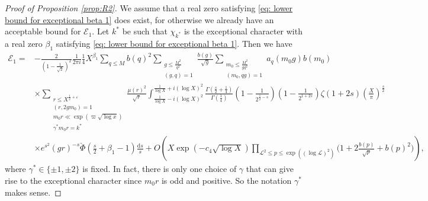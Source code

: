 \documentclass[12pt,reqno]{amsart}
\numberwithin{equation}{section}
\theoremstyle{plain}
\theoremstyle{definition}
\theoremstyle{remark}
\newcommand{\dd}{\mathrm{d}}
\begin{document}
\begin{proof}[Proof of Proposition \ref{prop:R2}]
We assume that a real zero satisfying \eqref{eq:  lower bound for exceptional beta 1} does exist, for otherwise we already have an acceptable bound for $\mathcal{E}_1$. Let $k^*$ be such that $\chi_{k^*}$ is the exceptional character with a real zero $\beta_1$ satisfying \eqref{eq:  lower bound for exceptional beta 1}. Then we have
\begin{equation}\label{eq: handle siegel zeros 1}
  \begin{split}
  \mathcal{E}_1=&-\frac{2}{\left( 1-\frac{1}{\sqrt{2}}\right)^2}\frac{1}{2\pi i}\frac{1}{4} X^{\beta_1} \sum_{q\leq M} b(q)^2 \sum_{\substack{ g\leq \frac{M^2}{q^2}\\ (g,q)=1}} \frac{b(g) }{ \sqrt{g}} \sum_{\substack{ m_0 \leq \frac{M^2}{gq^2} \\ (m_0,qg)=1}} a_q(m_0g)b(m_0)  \\
  &\times \sum_{\substack{r \leq X^{\frac{1}{2}+\varepsilon } \\ (r,2gm_0)=1 \\ m_0r\ll \exp(\varpi \sqrt{\log x}) \\ \gamma^*m_0r=k^*}} \frac{\mu (r)^2}{\sqrt{r}} \int_{\frac{1}{\log X}-i(\log X)^2}^{\frac{1}{\log X}+i(\log X)^2} \frac{\Gamma(\frac{s}{2}+\frac{1}{4})}{\Gamma(\frac{1}{4})} \left( 1-\frac{1}{2^{\frac{1}{2}-s}}\right)\left(1 - \frac{1}{2^{1+2s}}\right) \zeta(1+2s)\left(\frac{X}{\pi}\right)^{\frac{s}{2}}   \\
  &\times e^{s^2}\left( gr\right)^{-s} \check\Phi\left( \frac{s}{2}+\beta_1-1\right) \frac{\dd s}{s}+ O\left(X \exp(-c_4\sqrt{\log X})\prod_{\mathcal{L}^2\leq p \leq \exp((\log \mathcal{L})^2)}\bigg(1+2\frac{b(p)}
  {\sqrt{p}}+b(p)^2\bigg)\right),
  \end{split}
\end{equation}
where $\gamma^* \in \{ \pm 1, \pm 2\} $ is fixed. In fact, there is only one choice of $\gamma$ that can give rise to the exceptional character since $m_0r$ is odd and positive. So the notation $\gamma^*$ makes sense.


\end{proof}
\end{document}
